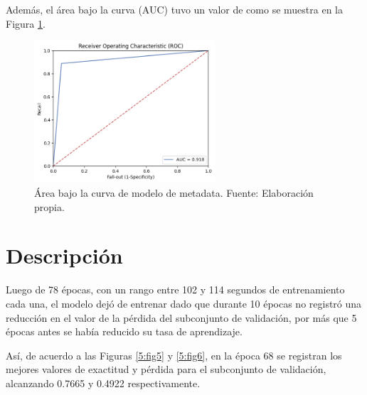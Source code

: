 Además, el área bajo la curva (AUC) tuvo un valor de como se muestra en la Figura \ref{5:fig4}.

\begin{figure}[!ht]
	\begin{center}
		\includegraphics[width=0.60\textwidth]{4/figures/metadata_auc.png}
		\caption{Área bajo la curva de modelo de metadata. Fuente: Elaboración propia.}
		\label{5:fig4}
	\end{center}
\end{figure}

\section{Descripción}
Luego de 78 épocas, con un rango entre 102 y 114 segundos de entrenamiento cada una, el modelo dejó de entrenar dado que durante 10 épocas no registró una reducción en el valor de la pérdida del subconjunto de validación, por más que 5 épocas antes se había reducido su tasa de aprendizaje.

Así, de acuerdo a las Figuras \ref{5:fig5} y \ref{5:fig6}, en la época 68 se registran los mejores valores de exactitud y pérdida para el subconjunto de validación, alcanzando 0.7665 y 0.4922 respectivamente.

